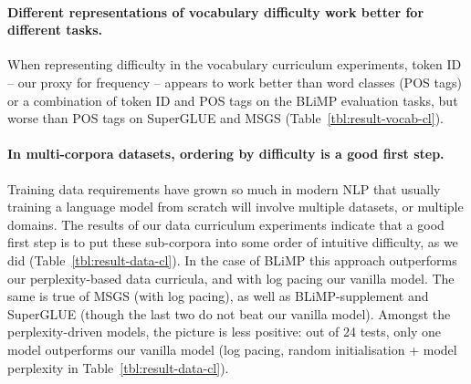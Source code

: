 \paragraph{Different representations of vocabulary difficulty work better for different tasks.}
When representing difficulty in the vocabulary curriculum experiments, token ID -- our proxy for frequency -- appears to work better than word classes (POS tags) or a combination of token ID and POS tags on the BLiMP evaluation tasks, but worse than POS tags on SuperGLUE and MSGS (Table~\ref{tbl:result-vocab-cl}).


\paragraph{In multi-corpora datasets, ordering by difficulty is a good first step.}
Training data requirements have grown so much in modern NLP that usually training a language model from scratch will involve multiple datasets, or multiple domains. The results of our data curriculum experiments indicate that a good first step is to put these sub-corpora into some order of intuitive difficulty, as we did (Table~\ref{tbl:result-data-cl}). In the case of BLiMP this approach outperforms our perplexity-based data curricula, and with log pacing our vanilla model. The same is true of MSGS  (with log pacing), as well as BLiMP-supplement and SuperGLUE (though the last two do not beat our vanilla model). 
Amongst the perplexity-driven models, the picture is less positive: out of 24 tests, only one model outperforms our vanilla model (log pacing, random initialisation + model perplexity in Table~\ref{tbl:result-data-cl}).

